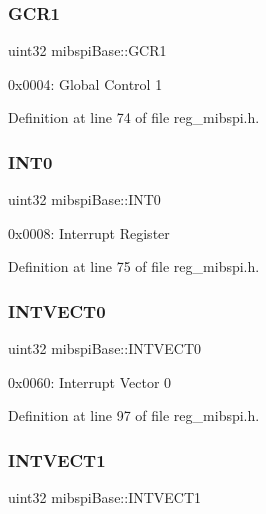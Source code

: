 \subsubsection{\texorpdfstring{G\+C\+R1}{GCR1}}
{\footnotesize\ttfamily uint32 mibspi\+Base\+::\+G\+C\+R1}

0x0004\+: Global Control 1 

Definition at line 74 of file reg\+\_\+mibspi.\+h.

\mbox{\label{structmibspiBase_a0c8e26d4d1a34fde7839c1fe30b9f1f6}} 
\subsubsection{\texorpdfstring{I\+N\+T0}{INT0}}
{\footnotesize\ttfamily uint32 mibspi\+Base\+::\+I\+N\+T0}

0x0008\+: Interrupt Register 

Definition at line 75 of file reg\+\_\+mibspi.\+h.

\mbox{\label{structmibspiBase_af17263f276d3f2d57268eaa5edbba548}} 
\subsubsection{\texorpdfstring{I\+N\+T\+V\+E\+C\+T0}{INTVECT0}}
{\footnotesize\ttfamily uint32 mibspi\+Base\+::\+I\+N\+T\+V\+E\+C\+T0}

0x0060\+: Interrupt Vector 0 

Definition at line 97 of file reg\+\_\+mibspi.\+h.

\mbox{\label{structmibspiBase_a7a09399d6e3a2606703b66696fb7b5fc}} 
\subsubsection{\texorpdfstring{I\+N\+T\+V\+E\+C\+T1}{INTVECT1}}
{\footnotesize\ttfamily uint32 mibspi\+Base\+::\+I\+N\+T\+V\+E\+C\+T1}

